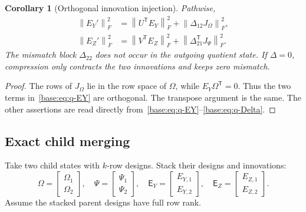 \documentclass[11pt,oneside,openany,a4paper]{book}
\numberwithin{equation}{chapter}
\newtheorem{corollary}[theorem]{Corollary}
\theoremstyle{definition}
\theoremstyle{remark}
\newcommand{\T}{\mathsf T}\newcommand{\Id}{I}
\newcommand{\F}[1]{\left\lVert#1\right\rVert_F}
\begin{document}
\begin{corollary}[Orthogonal innovation injection]\label{base:cor:q-energy}
Pathwise,
\begin{align}
 \F{E_Y'}^2&=\F{U^{\T}E_Y}^2+\F{\Delta_{12}J_\Omega}^2,\label{base:eq:q-energy-Y}\\
 \F{E_Z'}^2&=\F{V^{\T}E_Z}^2+\F{\Delta_{21}^{\T} J_\Psi}^2.\label{base:eq:q-energy-Z}
\end{align}
The mismatch block $\Delta_{22}$ does not occur in the outgoing quotient
state. If $\Delta=0$, compression only contracts the two innovations and
keeps zero mismatch.
\end{corollary}
\begin{proof}
The rows of $J_\Omega$ lie in the row space of $\Omega$, while
$E_Y\Omega^{\T}=0$. Thus the two terms in~\eqref{base:eq:q-EY} are orthogonal.
The transpose argument is the same. The other assertions are read directly
from~\eqref{base:eq:q-EY}--\eqref{base:eq:q-Delta}.\end{proof}

\subsection{Exact child merging}\label{base:subsec:quotient-merge}
Take two child states with $k$-row designs. Stack their designs and
innovations:
\begin{equation}\label{base:eq:merge-stack}
 \Omega=\begin{bmatrix}\Omega_1\\\Omega_2\end{bmatrix},\quad
 \Psi=\begin{bmatrix}\Psi_1\\\Psi_2\end{bmatrix},\quad
 \mathsf E_Y=\begin{bmatrix}E_{Y,1}\\E_{Y,2}\end{bmatrix},\quad
 \mathsf E_Z=\begin{bmatrix}E_{Z,1}\\E_{Z,2}\end{bmatrix}.
\end{equation}
Assume the stacked parent designs have full row rank.
\end{document}
